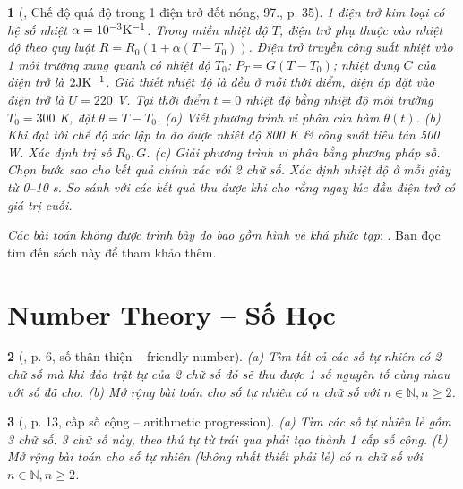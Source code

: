 \documentclass{article}
\newtheorem{baitoan}{}
\begin{document}
\begin{baitoan}[\cite{Doanh_Tuan_Pascal}, Chế độ quá độ trong 1 điện trở đốt nóng, 97., p. 35]
	 1 điện trở kim loại có hệ số nhiệt $\rm\alpha = 10^{-3}K^{-1}$. Trong miền nhiệt độ $T$, điện trở phụ thuộc vào nhiệt độ theo quy luật $R = R_0(1 + \alpha(T - T_0))$. Điện trở truyền công suất nhiệt vào 1 môi trường xung quanh có nhiệt độ $T_0$: $P_T = G(T - T_0)$; nhiệt dung $C$ của điện trở là $\rm2JK^{-1}$. Giả thiết nhiệt độ là đều ở mỗi thời điểm, điện áp đặt vào điện trở là $U = 220$ {\rm V}. Tại thời điểm $t = 0$ nhiệt độ bằng nhiệt độ môi trường $T_0 = 300$ {\rm K}, đặt $\theta = T - T_0$. (a) Viết phương trình vi phân của hàm $\theta(t)$. (b) Khi đạt tới chế độ xác lập ta đo được nhiệt độ {\rm800 K} \& công suất tiêu tán {\rm500 W}. Xác định trị số $R_0,G$. (c) Giải phương trình vi phân bằng phương pháp số. Chọn bước sao cho kết quả chính xác với 2 chữ số. Xác định nhiệt độ ở mỗi giây từ {\rm0--10 s}. So sánh với các kết quả thu được khi cho rằng ngay lúc đầu điện trở có giá trị cuối.
\end{baitoan}
\textit{Các bài toán không được trình bày do bao gồm hình vẽ khá phức tạp}: \cite[93., 94., 95., 96., 98., 99., 100., 101., pp. 32--38]{Doanh_Tuan_Pascal}. Bạn đọc tìm đến sách này để tham khảo thêm.


\section{Number Theory -- Số Học}

\begin{baitoan}[\cite{Huy_sang_tao_thuat_toan_lap_trinh_tap_1}, p. 6, số thân thiện -- friendly number]
	(a) Tìm tất cả các số tự nhiên có 2 chữ số mà khi đảo trật tự của 2 chữ số đó sẽ thu được 1 số nguyên tố cùng nhau với số đã cho. (b) Mở rộng bài toán cho số tự nhiên có $n$ chữ số với $n\in\mathbb{N},n\ge2$.
\end{baitoan}

\begin{baitoan}[\cite{Huy_sang_tao_thuat_toan_lap_trinh_tap_1}, p. 13, cấp số cộng -- arithmetic progression]
	(a) Tìm các số tự nhiên lẻ gồm 3 chữ số. 3 chữ số này, theo thứ tự từ trái qua phải tạo thành 1 cấp số cộng. (b) Mở rộng bài toán cho số tự nhiên (không nhất thiết phải lẻ) có $n$ chữ số với $n\in\mathbb{N},n\ge2$.
\end{baitoan}
\end{document}
